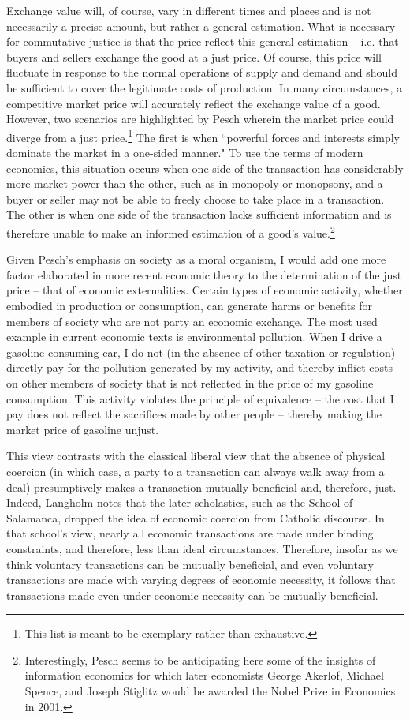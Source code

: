 \documentclass{article}
\begin{document}
Exchange value will, of course, vary in different times and places and is not necessarily a precise amount, but rather a general estimation.  What is necessary for commutative justice is that the price reflect this general estimation – i.e. that buyers and sellers exchange the good at a just price.  Of course, this price will fluctuate in response to the normal operations of supply and demand and should be sufficient to cover the legitimate costs of production.  In many circumstances, a competitive market price will accurately reflect the exchange value of a good.  However, two scenarios are highlighted by Pesch wherein the market price could diverge from a just price.\footnote{This list is meant to be exemplary rather than exhaustive.}  The first is when ``powerful forces and interests simply dominate the market in a one-sided manner." \citep[p. 221]{pesch1998}  To use the terms of modern economics, this situation occurs when one side of the transaction has considerably more market power than the other, such as in monopoly or monopsony, and a buyer or seller may not be able to freely choose to take place in a transaction.  The other is when one side of the transaction lacks sufficient information and is therefore unable to make an informed estimation of a good’s value.\footnote{Interestingly, Pesch seems to be anticipating here some of the insights of information economics for which later economists George Akerlof, Michael Spence, and Joseph Stiglitz would be awarded the Nobel Prize in Economics in 2001.}\medskip

Given Pesch’s emphasis on society as a moral organism, I would add one more factor elaborated in more recent economic theory to the determination of the just price – that of economic externalities.  Certain types of economic activity, whether embodied in production or consumption, can generate harms or benefits for members of society who are not party an economic exchange.  The most used example in current economic texts is environmental pollution.  When I drive a gasoline-consuming car, I do not (in the absence of other taxation or regulation) directly pay for the pollution generated by my activity, and thereby inflict costs on other members of society that is not reflected in the price of my gasoline consumption.  This activity violates the principle of equivalence – the cost that I pay does not reflect the sacrifices made by other people – thereby making the market price of gasoline unjust.\medskip

This view contrasts with the classical liberal view that the absence of physical coercion (in which case, a party to a transaction can always walk away from a deal) presumptively makes a transaction mutually beneficial and, therefore, just.  Indeed, Langholm notes that the later scholastics, such as the School of Salamanca, dropped the idea of economic coercion from Catholic discourse.  In that school’s view, nearly all economic transactions are made under binding constraints, and therefore, less than ideal circumstances.  Therefore, insofar as we think voluntary transactions can be mutually beneficial, and even voluntary transactions are made with varying degrees of economic necessity, it follows that transactions made even under economic necessity can be mutually beneficial.\medskip
\end{document}
